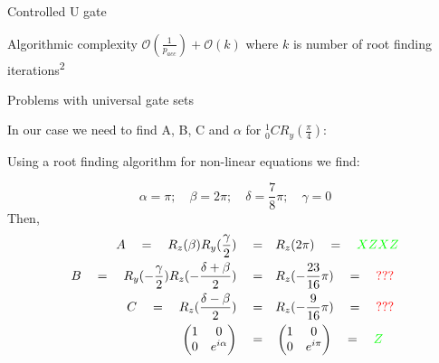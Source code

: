 \documentclass[10pt]{beamer}
\begin{document}
{\begin{frame}{Controlled U gate}

	\begin{alertblock}{Algorithmic complexity}
	$\mathcal{O}(\frac{1}{p_{acc}})+\mathcal{O}(k)$ where $k$ is number of root finding iterations\textsuperscript{2}
	\end{alertblock}
\end{frame}

}

{
\begin{frame}{Problems with universal gate sets}

In our case we need to find A, B, C and $\alpha$ for $_0^1CR_y(\frac{\pi}{4})$:

Using a root finding algorithm for non-linear equations we find:

\begin{equation}
\alpha =  \pi; \quad 
\beta = 2\pi;\quad 
\delta = \frac{7}{8}\pi;\quad 
\gamma = 0
\end{equation}
Then,
\begin{align}
A \quad= \quad R_z(\beta)R_y(\frac{\gamma}{2})\quad =& \quad R_z(2\pi) \quad = \quad \textcolor{green}{XZXZ} \\
B\quad =\quad R_y(-\frac{\gamma}{2})R_z(-\frac{\delta+\beta}{2})\quad =& \quad R_z(-\frac{23}{16}\pi) \quad= \quad \textcolor{red}{???}  \\
C \quad=\quad R_z(\frac{\delta-\beta}{2})\quad =& \quad R_z(-\frac{9}{16}\pi) \quad= \quad \textcolor{red}{???} \\
\begin{pmatrix} 1&0\cr0&e^{i\alpha} \end{pmatrix}\quad=& \quad \begin{pmatrix} 1&0\cr0&e^{i\pi} \end{pmatrix}\quad= \quad \textcolor{green}{Z}
\end{align}

\end{frame}
}
\end{document}
